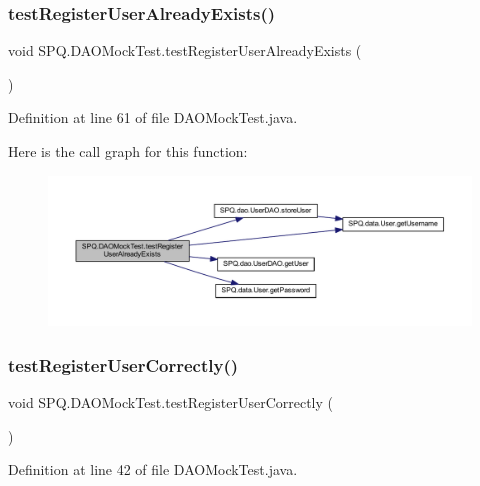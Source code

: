 \subsubsection{\texorpdfstring{test\+Register\+User\+Already\+Exists()}{testRegisterUserAlreadyExists()}}
{\footnotesize\ttfamily void S\+P\+Q.\+D\+A\+O\+Mock\+Test.\+test\+Register\+User\+Already\+Exists (\begin{DoxyParamCaption}{ }\end{DoxyParamCaption})}



Definition at line 61 of file D\+A\+O\+Mock\+Test.\+java.

Here is the call graph for this function\+:
\nopagebreak
\begin{figure}[H]
\begin{center}
\leavevmode
\includegraphics[width=350pt]{class_s_p_q_1_1_d_a_o_mock_test_a76004a006ddce595edc7011aafccbe7e_cgraph}
\end{center}
\end{figure}
\mbox{\label{class_s_p_q_1_1_d_a_o_mock_test_a52505d1cfefe105f8098147df9d2fce0}} 
\subsubsection{\texorpdfstring{test\+Register\+User\+Correctly()}{testRegisterUserCorrectly()}}
{\footnotesize\ttfamily void S\+P\+Q.\+D\+A\+O\+Mock\+Test.\+test\+Register\+User\+Correctly (\begin{DoxyParamCaption}{ }\end{DoxyParamCaption})}



Definition at line 42 of file D\+A\+O\+Mock\+Test.\+java.

